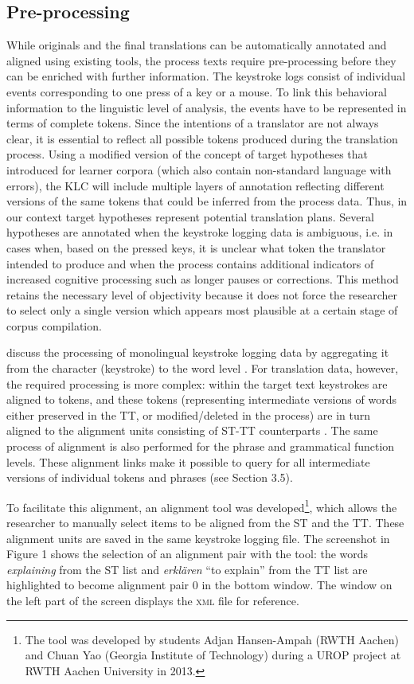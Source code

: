 \documentclass[output=paper]{LSP/langsci}
\begin{document}
\subsection{Pre-processing}
While originals and the final translations can be automatically annotated and aligned using existing tools, the process texts require pre-processing before they can be enriched with further information. The keystroke logs consist of individual events corresponding to one press of a key or a mouse. To link this behavioral information to the linguistic level of analysis, the events have to be represented in terms of complete tokens. Since the intentions of a translator are not always clear, it is essential to reflect all possible tokens produced during the translation process. Using a modified version of the concept of target hypotheses that \citet{Lüdeling2008} introduced for learner corpora (which also contain non-standard language with errors), the KLC will include multiple layers of annotation reflecting different versions of the same tokens that could be inferred from the process data. Thus, in our context target hypotheses represent potential translation plans. Several hypotheses are annotated when the keystroke logging data is ambiguous, i.e. in cases when, based on the pressed keys, it is unclear what token the translator intended to produce and when the process contains additional indicators of increased cognitive processing such as longer pauses or corrections. This method retains the necessary level of objectivity because it does not force the researcher to select only a single version which appears most plausible at a certain stage of corpus compilation.

\citet{Leijten2012} discuss the processing of monolingual keystroke logging data by aggregating it from the character (keystroke) to the word level \citep[see also][]{Macken2012}. For translation data, however, the required processing is more complex: within the target text keystrokes are aligned to tokens, and these tokens (representing intermediate versions of words either preserved in the TT, or modified/deleted in the process) are in turn aligned to the alignment units consisting of ST-TT counterparts \citep[see][227]{Carl2009a}. The same process of alignment is also performed for the phrase and grammatical function levels. These alignment links make it possible to query for all intermediate versions of individual tokens and phrases (see Section 3.5).

To facilitate this alignment, an alignment tool was developed\footnote{The tool was developed by students Adjan Hansen-Ampah (RWTH Aachen) and Chuan Yao (Georgia Institute of Technology) during a UROP project at RWTH Aachen University in 2013.}, which allows the researcher to manually select items to be aligned from the ST and the TT. These alignment units are saved in the same keystroke logging file. The screenshot in Figure 1 shows the selection of an alignment pair with the tool: the words \textit{explaining }from the ST list and \textit{erklären} “to explain” from the TT list are highlighted to become alignment pair 0 in the bottom window. The window on the left part of the screen displays the \textsc{xml} file for reference.
\end{document}
